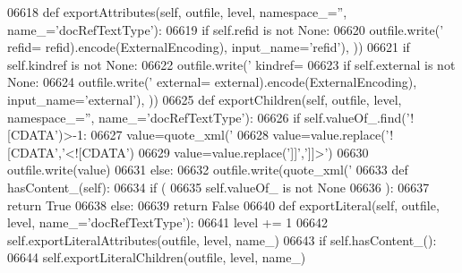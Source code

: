 \begin{DoxyCode}
{{{{{{{{{{{{{{{{{{{{{{{{{{{{{{{{{{{{{{{{{{{{{{{{{{{{{{{{{{{{{{{{{{{{{{{{{{{{{{{{{{{{{{{{{{{{{{{{{{{{{{{{{{{{{{{{{{{{{{{{{{{{{{{{{{{{{{{{{{{{{{{{{{{{{{{{{{{{{{{{{{{{{{{{{{{{{{{{{{{{{{{{{{{{{{{{{{{{{{{{{{{{{{{{{{{{{{{{{{{{{{{{{{{{{{{{{{{{{{{{{{{{{{{{{{{{{{{{{{{{{{{{{{{{{{{{{{{{{{{{{{{{{{{{{{{{{{{{{{{{{{{{{{{{{{{{{{{{{{{{{{{{{{{{{{{{{{{{{{{{{{{{{{{{{{{{{{{{{{{{{{{{{{{{{{{{{{{{{{{{{{{{{{{{{{{{{{{{{{{{{{{{{06618     \textcolor{keyword}{def }exportAttributes(self, outfile, level, namespace\_='', name\_='docRefTextType'):
06619         \textcolor{keywordflow}{if} self.refid \textcolor{keywordflow}{is} \textcolor{keywordflow}{not} \textcolor{keywordtype}{None}:
06620             outfile.write(\textcolor{stringliteral}{' refid=%
      refid).encode(ExternalEncoding), input\_name=\textcolor{stringliteral}{'refid'}), ))
06621         \textcolor{keywordflow}{if} self.kindref \textcolor{keywordflow}{is} \textcolor{keywordflow}{not} \textcolor{keywordtype}{None}:
06622             outfile.write(\textcolor{stringliteral}{' kindref=%
06623         \textcolor{keywordflow}{if} self.external \textcolor{keywordflow}{is} \textcolor{keywordflow}{not} \textcolor{keywordtype}{None}:
06624             outfile.write(\textcolor{stringliteral}{' external=%
      external).encode(ExternalEncoding), input\_name=\textcolor{stringliteral}{'external'}), ))
06625     \textcolor{keyword}{def }exportChildren(self, outfile, level, namespace\_='', name\_='docRefTextType'):
06626         \textcolor{keywordflow}{if} self.valueOf\_.find(\textcolor{stringliteral}{'![CDATA'})>-1:
06627             value=quote_xml(\textcolor{stringliteral}{'%
06628             value=value.replace(\textcolor{stringliteral}{'![CDATA'},\textcolor{stringliteral}{'<![CDATA'})
06629             value=value.replace(\textcolor{stringliteral}{']]'},\textcolor{stringliteral}{']]>'})
06630             outfile.write(value)
06631         \textcolor{keywordflow}{else}:
06632             outfile.write(quote_xml(\textcolor{stringliteral}{'%
06633     \textcolor{keyword}{def }hasContent_(self):
06634         \textcolor{keywordflow}{if} (
06635             self.valueOf_ \textcolor{keywordflow}{is} \textcolor{keywordflow}{not} \textcolor{keywordtype}{None}
06636             ):
06637             \textcolor{keywordflow}{return} \textcolor{keyword}{True}
06638         \textcolor{keywordflow}{else}:
06639             \textcolor{keywordflow}{return} \textcolor{keyword}{False}
06640     \textcolor{keyword}{def }exportLiteral(self, outfile, level, name\_='docRefTextType'):
06641         level += 1
06642         self.exportLiteralAttributes(outfile, level, name\_)
06643         \textcolor{keywordflow}{if} self.hasContent_():
06644             self.exportLiteralChildren(outfile, level, name\_)
}}}}}}}}}}}}}}}}}}}}}}}}}}}}}}}}}}}}}}}}}}}}}}}}}}}}}}}}}}}}}}}}}}}}}}}}}}}}}}}}}}}}}}}}}}}}}}}}}}}}}}}}}}}}}}}}}}}}}}}}}}}}}}}}}}}}}}}}}}}}}}}}}}}}}}}}}}}}}}}}}}}}}}}}}}}}}}}}}}}}}}}}}}}}}}}}}}}}}}}}}}}}}}}}}}}}}}}}}}}}}}}}}}}}}}}}}}}}}}}}}}}}}}}}}}}}}}}}}}}}}}}}}}}}}}}}}}}}}}}}}}}}}}}}}}}}}}}}}}}}}}}}}}}}}}}}}}}}}}}}}}}}}}}}}}}}}}}}}}}}}}}}}}}}}}}}}}}}}}}}}}}}}}}}}}}}}}}}}}}}}}}}}}}}}}}}}}}}}}}}}}}}}}}}}}
\end{DoxyCode}
